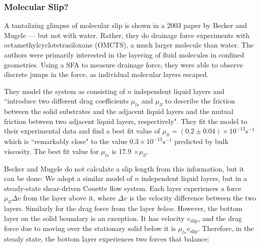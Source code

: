 \documentclass[12pt, a4paper, twoside, openright]{book}
\begin{document}
\subsubsection{Molecular Slip?}

A tantalizing glimpse of molecular slip is shown in a 2003 paper by Becker and Mugele \cite{BeckerMugele2003} --- but not with water.  Rather, they do drainage force experiments with octamethylcyclotetrasiloxane (OMCTS), a much larger molecule than water. The authors were primarily interested in the layering of fluid molecules in confined geometries.  Using a SFA to measure drainage force, they were able to observe discrete jumps in the force, as individual molecular layers escaped. 


They model the system as consisting of $n$ independent liquid layers and ``introduce two different drag coefficients $\mu_{ls}$ and $\mu_{ll}$ to describe the friction between the solid substrates and the adjacent liquid layers and the mutual friction between two adjacent liquid layers, respectively".  They fit the model to their experimental data and find a best fit value of $\mu_{ll} = (0.2 \pm 0.04) \times 10^{-13} \mathrm{s}^{-1}$ which is ``remarkably close" to the value $0.3 \times 10^{-13} \mathrm{s}^{-1} $ predicted by bulk viscosity. The best fit value for $\mu_{ls}$ is 17.9 $\times \mu_{ll}$.

Becker and Mugele do not calculate a slip length from this information, but it can be done:
We adopt a similar model of $n$ independent liquid layers, but in a steady-state shear-driven Couette flow system.  Each layer experiences a force $\mu_{ll} \Delta v$ from the layer above it, where $\Delta v$ is the velocity difference between the two layers.
Similarly for the drag force from the layer \emph{below.}
However, the bottom layer on the solid boundary is an exception.  It has velocity $v_{\mathrm{slip}}$, and the drag force due to moving over the stationary solid below it is $ \mu_{ls} v_{\mathrm{slip}} $.
Therefore, in the steady state, the bottom layer experiences two forces that balance:
\end{document}
